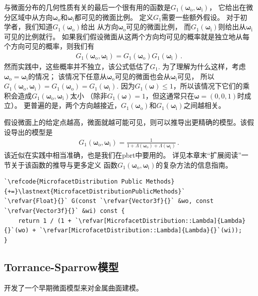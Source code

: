 与微面分布的几何性质有关的最后一个很有用的函数是$G_1({\bm\omega}_{\mathrm{o}},{\bm\omega}_{\mathrm{i}})$，
它给出在微分区域中从方向${\bm\omega}_{\mathrm{o}}$和${\bm\omega}_{\mathrm{i}}$都可见的微面比例。
定义$G_1$需要一些额外假设。
对于初学者，我们知道$G_1({\bm\omega}_{\mathrm{o}})$给出
从方向${\bm\omega}_{\mathrm{o}}$可见的微面比例，
而$G_1({\bm\omega}_{\mathrm{i}})$则给出从${\bm\omega}_{\mathrm{i}}$可见的比例就行。
如果我们假设微面从这两个方向均可见的概率就是独立地从每个方向可见的概率，则我们有
\begin{align*}
    G_1({\bm\omega}_{\mathrm{o}},{\bm\omega}_{\mathrm{i}})=G_1({\bm\omega}_{\mathrm{o}})G_1({\bm\omega}_{\mathrm{i}})\, .
\end{align*}
然而实践中，这些概率并不独立，该公式低估了$G_1$.
为了理解为什么这样，考虑${\bm\omega}_{\mathrm{o}}={\bm\omega}_{\mathrm{i}}$的情况；
该情况下任意从${\bm\omega}_{\mathrm{o}}$可见的微面也会从${\bm\omega}_{\mathrm{i}}$可见，
所以$G_1({\bm\omega}_{\mathrm{o}},{\bm\omega}_{\mathrm{i}})=G_1({\bm\omega}_{\mathrm{o}})=G_1({\bm\omega}_{\mathrm{i}})$.
因为$G_1({\bm\omega})\le 1$，所以该情况下它们的乘积会造成$G_1({\bm\omega}_{\mathrm{o}},{\bm\omega}_{\mathrm{i}})$太小
（除非$G_1({\bm\omega})=1$，但这通常只在${\bm\omega}=(0,0,1)$时成立）。
更普遍的是，两个方向越接近，$G_1({\bm\omega}_{\mathrm{o}})$和$G_1({\bm\omega}_{\mathrm{i}})$之间越相关。

假设微面上的给定点越高，微面就越可能可见，则可以推导出更精确的模型。该假设导出的模型是
\begin{align*}
    G_1({\bm\omega}_{\mathrm{o}},{\bm\omega}_{\mathrm{i}})=\frac{1}{1+\Lambda({\bm\omega}_{\mathrm{o}})+\Lambda({\bm\omega}_{\mathrm{i}})}\, .
\end{align*}
该近似在实践中相当准确，也是我们在pbrt中要用的。
详见本章末“扩展阅读”一节关于该函数的推导与更多定义
函数$G_1({\bm\omega}_{\mathrm{o}},{\bm\omega}_{\mathrm{i}})$的复杂方法的信息指南。
\begin{lstlisting}
`\refcode{MicrofacetDistribution Public Methods}{+=}\lastnext{MicrofacetDistributionPublicMethods}`
`\refvar{Float}{}` G(const `\refvar{Vector3f}{}` &wo, const `\refvar{Vector3f}{}` &wi) const {
    return 1 / (1 + `\refvar[MicrofacetDistribution::Lambda]{Lambda}{}`(wo) + `\refvar[MicrofacetDistribution::Lambda]{Lambda}{}`(wi));
}
\end{lstlisting}

\subsection{Torrance-Sparrow模型}\label{sub:Torrance-Sparrow模型}
\citet{Torrance:67}开发了一个早期微面模型来对金属曲面建模。